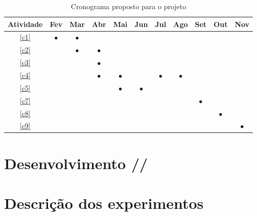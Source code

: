 \begin{table}[h]

\renewcommand{\arraystretch}{1}
\setlength\tabcolsep{3pt}
\begin{center}
\begin{tabular}{| c | c | c | c | c | c | c | c | c | c | c |}
\hline

Atividade &Fev &Mar &Abr &Mai &Jun &Jul &Ago &Set &Out &Nov \\ \hline \hline
\ref{c1}   &$\bullet$ &$\bullet$ & & & & & & & & \\ \hline
\ref{c2}   & &$\bullet$ &$\bullet$ & & & & & & & \\ \hline
\ref{c3}   & & &$\bullet$ & & & & & & & \\ \hline
\ref{c4}   & & &$\bullet$ &$\bullet$ & &$\bullet$ &$\bullet$ & & & \\ \hline
\ref{c5}   & & & &$\bullet$ &$\bullet$ & & & & & \\ \hline
\ref{c7}   & & & & & & & &$\bullet$ & & \\ \hline
\ref{c8}   & & & & & & & & &$\bullet$ & \\ \hline
\ref{c9}   & & & & & & & & & &$\bullet$ \\ 
\hline
\end{tabular}
\end{center}
\caption{Cronograma proposto para o projeto}
\label{tab:cronograma}
\end{table}

\section{Desenvolvimento //}

\section{Descrição dos experimentos}